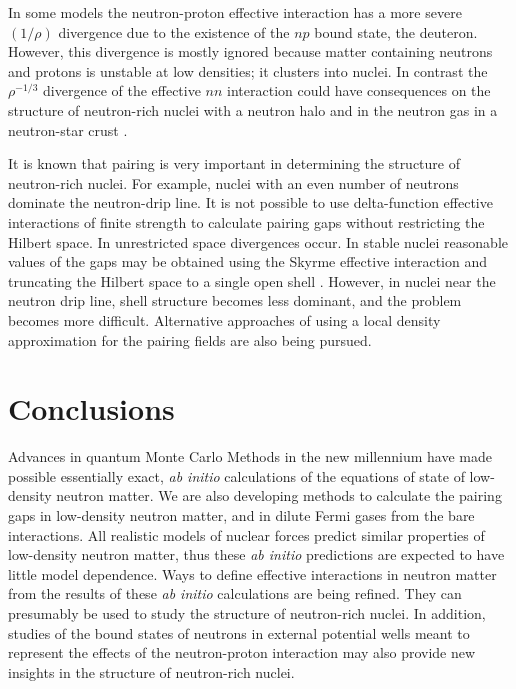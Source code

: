 In some models \cite{pr} the neutron-proton effective interaction has a more severe 
$(1/\rho)$ divergence due to the existence of the $np$ bound state, the deuteron. 
However, this divergence 
is mostly ignored because matter containing neutrons and protons is 
unstable at low densities; it clusters into nuclei.  In contrast the $\rho^{-1/3}$ divergence 
of the effective $nn$ interaction could have consequences on the structure of 
neutron-rich nuclei with a neutron halo and in the neutron gas in a neutron-star crust 
\cite{anr1}.  

It is known that pairing is very important in determining the structure of neutron-rich 
nuclei.  For example, nuclei with an even number of neutrons dominate the neutron-drip 
line.  It is not possible to use delta-function effective interactions of finite 
strength to 
calculate pairing gaps without restricting the Hilbert space.  In unrestricted 
space divergences occur.  In stable nuclei reasonable values of the gaps may be 
obtained using the Skyrme effective interaction 
and truncating the Hilbert space to a single open shell \cite{ndrop2}. 
However, in nuclei near the neutron drip line, shell structure 
becomes less dominant, and the problem becomes more difficult.  Alternative 
approaches of using a local density approximation for the pairing fields 
\cite{Bulgac} are also being pursued. 

\section{Conclusions}

Advances in quantum Monte Carlo Methods in the new millennium have made possible essentially 
exact, {\em ab initio} calculations of the equations of state of low-density neutron 
matter.  We are also developing methods to calculate the pairing gaps in 
low-density neutron matter, and in dilute Fermi gases from the bare interactions.  
All realistic models of nuclear forces predict similar properties of low-density 
neutron matter, thus these {\em ab initio} predictions are expected to have little 
model dependence.  Ways to define effective interactions in neutron matter from the 
results of these {\em ab initio} calculations are being refined.  They can presumably 
be used to study the structure of neutron-rich nuclei.  In addition, studies of the 
bound states of neutrons in external potential wells meant to represent the effects 
of the neutron-proton interaction may also provide 
new insights in the structure of neutron-rich nuclei.  


